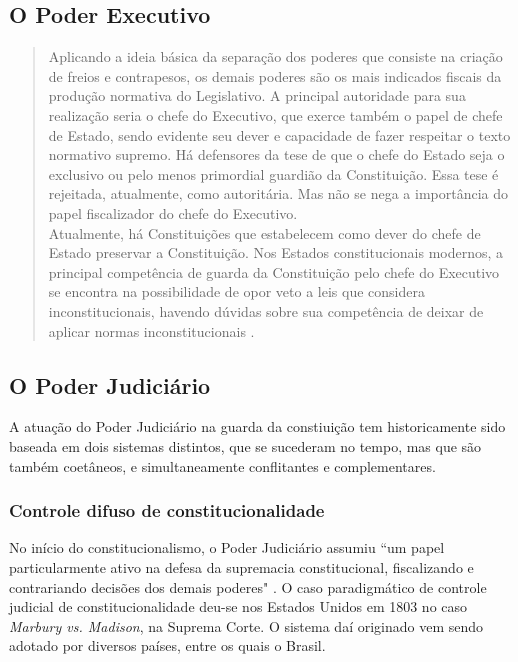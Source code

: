 \documentclass{article}
\begin{document}
\subsection{O Poder Executivo}

\begin{quote}
    Aplicando a ideia básica da separação dos poderes que consiste na criação de freios e contrapesos, os demais poderes são os mais indicados fiscais da produção normativa do Legislativo. A principal autoridade para sua realização seria o chefe do Executivo, que exerce também o papel de chefe de Estado, sendo evidente seu dever e capacidade de fazer respeitar o texto normativo supremo. Há defensores da tese de que o chefe do Estado seja o exclusivo ou pelo menos primordial guardião da Constituição. Essa tese é rejeitada, atualmente, como autoritária. Mas não se nega a importância do papel fiscalizador do chefe do Executivo.\\
    Atualmente, há Constituições que estabelecem como dever do chefe de Estado preservar a Constituição. Nos Estados constitucionais modernos, a principal competência de guarda da Constituição pelo chefe do Executivo se encontra na possibilidade de opor veto a leis que considera inconstitucionais, havendo dúvidas sobre sua competência de deixar de aplicar normas inconstitucionais \cite[pp.~24-25]{dimoulis_curso_2016}.
\end{quote}

\subsection{O Poder Judiciário}

A atuação do Poder Judiciário na guarda da constiuição tem historicamente sido baseada em dois sistemas distintos, que se sucederam no tempo, mas que são também coetâneos, e simultaneamente conflitantes e complementares.

\subsubsection{Controle difuso de constitucionalidade} No início do constitucionalismo, o Poder Judiciário assumiu ``um papel particularmente ativo na defesa da supremacia constitucional, fiscalizando e contrariando decisões dos demais poderes" \cite[p.~25]{dimoulis_curso_2016}. O caso paradigmático de controle judicial de constitucionalidade deu-se nos Estados Unidos em 1803 no caso \textit{Marbury vs. Madison}, na Suprema Corte. O sistema daí originado vem sendo adotado por diversos países, entre os quais o Brasil.
\end{document}
